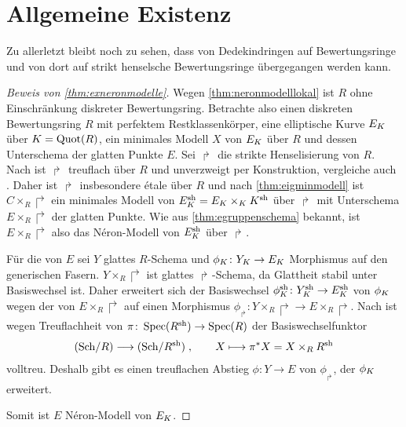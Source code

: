 \section{Allgemeine Existenz}\label{chap:exneronmodellebeweis}
Zu allerletzt bleibt noch zu sehen, dass von Dedekindringen
auf Bewertungsringe und von dort auf strikt henselsche Bewertungsringe
übergegangen werden kann.
\begin{proof}[Beweis von \ref{thm:exneronmodelle}]
  Wegen \ref{thm:neronmodelllokal} ist $R$ ohne Einschränkung
  diskreter Bewertungsring.
  Betrachte also einen diskreten Bewertungsring $R$ mit perfektem
  Restklassenkörper, eine elliptische Kurve $E_{K}$ über $K=\operatorname{Quot}(R)$,
  ein minimales Modell $X$ von $E_{K}$ über $R$ und dessen Unterschema
  der glatten Punkte $E$.
  Sei $\Rsh$ die strikte Henselisierung von $R$.
  Nach \cite[Chapter~2.4, Corollary~9]{neron} ist $\Rsh$ treuflach
  über $R$ und unverzweigt per Konstruktion, vergleiche auch
  \cite[Chapter~2.3, Proposition~11]{neron}.
  Daher ist $\Rsh$ insbesondere étale über $R$ und nach
  \ref{thm:eigminmodell} ist $C\times_R\Rsh$ ein minimales Modell von
  ${E_\Ksh=E_\K\times_\K\Ksh}$ über $\Rsh$ mit Unterschema
  $E\times_R\Rsh$ der glatten Punkte.
  Wie aus \ref{thm:egruppenschema} bekannt, ist $E\times_R\Rsh$ also
  das Néron-Modell von $E_\Ksh$ über $\Rsh$.

  Für die \NAbbEig von $E$ sei $Y$ glattes $R$-Schema und
  ${\phi_{K}\colon Y_{K}\to E_{K}}$ Morphismus auf den generischen Fasern.
  $Y\times_R\Rsh$ ist glattes $\Rsh$-Schema, da Glattheit stabil unter
  Basiswechsel ist. Daher erweitert sich der Basiswechsel
  ${\phi_\Ksh\colon Y_\Ksh\to E_\Ksh}$ von $\phi_{K}$ wegen der \NAbbEig
  von $E\times_R\Rsh$ auf einen Morphismus
  ${\phi_\Rsh\colon Y\times_R\Rsh\to E\times_R\Rsh}$.
  Nach \cite[Chapter~6.1, Theorem~6]{neron} ist wegen Treuflachheit
  von ${\pi\colon\operatorname{Spec}(R^{\text{sh}})\to\operatorname{Spec}(R)}$ der Basiswechselfunktor
  \begin{gather*}
    \text{(Sch/$R$)}\longrightarrow\text{(Sch/$R^{\text{sh}}$)}\;,
    \qquad
    X\longmapsto \pi^*X=X\times_RR^{\text{sh}}
  \end{gather*}
  volltreu. Deshalb gibt es einen treuflachen Abstieg
  ${\phi\colon Y\to E}$ von $\phi_\Rsh$, der $\phi_{K}$ erweitert.

  Somit ist $E$ Néron-Modell von $E_{K}$.
\end{proof}

